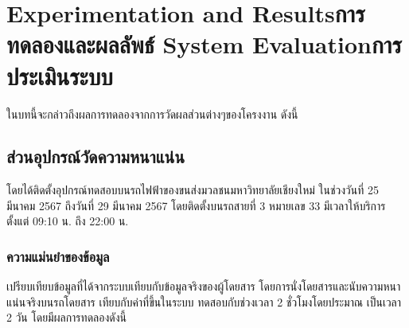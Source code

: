 \chapter{\ifproject%
\ifenglish Experimentation and Results\else การทดลองและผลลัพธ์\fi
\else%
\ifenglish System Evaluation\else การประเมินระบบ\fi
\fi}

ในบทนี้จะกล่าวถึงผลการทดลองจากการวัดผลส่วนต่างๆของโครงงาน ดังนี้

\section{ส่วนอุปกรณ์วัดความหนาแน่น}

โดยได้ติดตั้งอุปกรณ์ทดสอบบนรถไฟฟ้าของขนส่งมวลชนมหาวิทยาลัยเชียงใหม่ ในช่วงวันที่ 25 มีนาคม 2567 ถึงวันที่ 29 มีนาคม 2567 โดยติดตั้งบนรถสายที่ 3 หมายเลข 33 มีเวลาให้บริการตั้งแต่ 09:10 น. ถึง 22:00 น.

\subsection{ความแม่นยำของข้อมูล}

เปรียบเทียบข้อมูลที่ได้จากระบบเทียบกับข้อมูลจริงของผู้โดยสาร โดยการนั่งโดยสารและนับความหนาแน่นจริงบนรถโดยสาร เทียบกับค่าที่ขึ้นในระบบ ทดสอบกับช่วงเวลา 2 ชั่วโมงโดยประมาณ เป็นเวลา 2 วัน โดยมีผลการทดลองดังนี้


